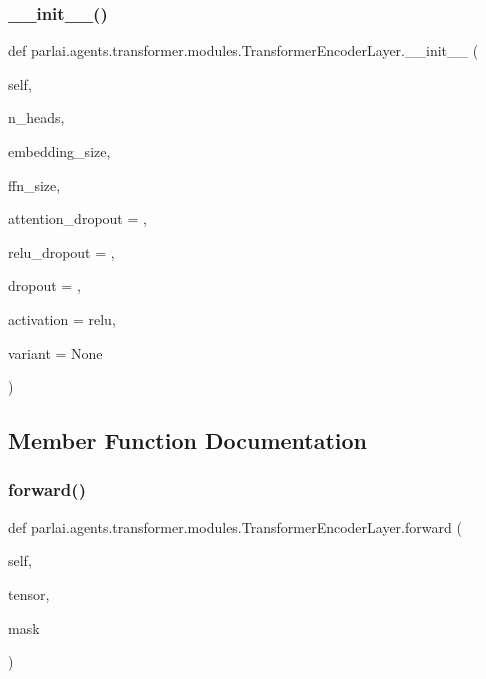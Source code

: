 \subsubsection{\texorpdfstring{\+\_\+\+\_\+init\+\_\+\+\_\+()}{\_\_init\_\_()}}
{\footnotesize\ttfamily def parlai.\+agents.\+transformer.\+modules.\+Transformer\+Encoder\+Layer.\+\_\+\+\_\+init\+\_\+\+\_\+ (\begin{DoxyParamCaption}\item[{}]{self,  }\item[{}]{n\+\_\+heads,  }\item[{}]{embedding\+\_\+size,  }\item[{}]{ffn\+\_\+size,  }\item[{}]{attention\+\_\+dropout = {},  }\item[{}]{relu\+\_\+dropout = {},  }\item[{}]{dropout = {},  }\item[{}]{activation = {\ttfamily \textquotesingle{}relu\textquotesingle{}},  }\item[{}]{variant = {\ttfamily None} }\end{DoxyParamCaption})}



\subsection{Member Function Documentation}
\mbox{\label{classparlai_1_1agents_1_1transformer_1_1modules_1_1TransformerEncoderLayer_aba0474eb3a08b6c482648adc0804776e}} 
\subsubsection{\texorpdfstring{forward()}{forward()}}
{\footnotesize\ttfamily def parlai.\+agents.\+transformer.\+modules.\+Transformer\+Encoder\+Layer.\+forward (\begin{DoxyParamCaption}\item[{}]{self,  }\item[{}]{tensor,  }\item[{}]{mask }\end{DoxyParamCaption})}


